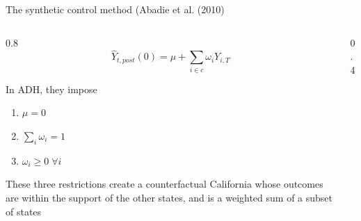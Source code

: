 \documentclass[notes,11pt, aspectratio=169]{beamer}
\newenvironment{wideitemize}{\itemize\addtolength{\itemsep}{10pt}}{\enditemize}
\begin{document}
\begin{frame}{The synthetic control method (Abadie et al. (2010)}
  \begin{columns}[T] %
    \begin{column}{0.8\textwidth}
  \begin{equation*}
    \hat{Y}_{t,post}(0) = \mu + \sum_{i \in c}\omega_{i} Y_{i, T}
  \end{equation*}
  \begin{wideitemize}
  \item In ADH, they impose
    \begin{enumerate}
    \item $\mu = 0$
    \item $\sum_{i} \omega_{i} = 1$
    \item $\omega_{i} \geq 0 \; \forall i$
    \end{enumerate}
  \item These three restrictions create a counterfactual California
    whose outcomes are within the support of the other states, and
    is a weighted sum of a subset of states
  \end{wideitemize}
\end{column}
\begin{column}{0.4\textwidth}
\end{column}
\end{columns}
\end{frame}
\end{document}
